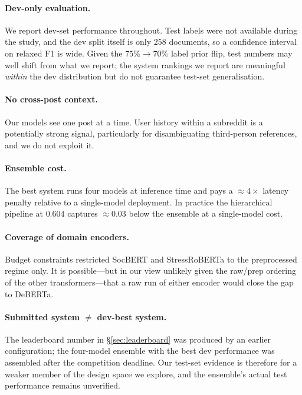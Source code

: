 \documentclass[11pt]{article}
\begin{document}
\paragraph{Dev-only evaluation.} We report dev-set performance
throughout. Test labels were not available during the study, and the
dev split itself is only $258$ documents, so a confidence interval on
relaxed F1 is wide. Given the $75\%\to 70\%$ label prior flip, test
numbers may well shift from what we report; the system rankings we
report are meaningful \emph{within} the dev distribution but do not
guarantee test-set generalisation.

\paragraph{No cross-post context.} Our models see one post at a time.
User history within a subreddit is a potentially strong signal,
particularly for disambiguating third-person references, and we do not
exploit it.

\paragraph{Ensemble cost.} The best system runs four models at
inference time and pays a $\approx 4\times$ latency penalty relative
to a single-model deployment. In practice the hierarchical pipeline at
$0.604$ captures $\approx 0.03$ below the ensemble at a single-model
cost.

\paragraph{Coverage of domain encoders.} Budget constraints restricted
SocBERT and StressRoBERTa to the preprocessed regime only. It is
possible---but in our view unlikely given the raw/prep ordering of the
other transformers---that a raw run of either encoder would close the
gap to DeBERTa.

\paragraph{Submitted system $\neq$ dev-best system.} The leaderboard
number in \S\ref{sec:leaderboard} was produced by an earlier
configuration; the four-model ensemble with the best dev performance
was assembled after the competition deadline. Our test-set evidence is
therefore for a weaker member of the design space we explore, and the
ensemble's actual test performance remains unverified.
\end{document}
